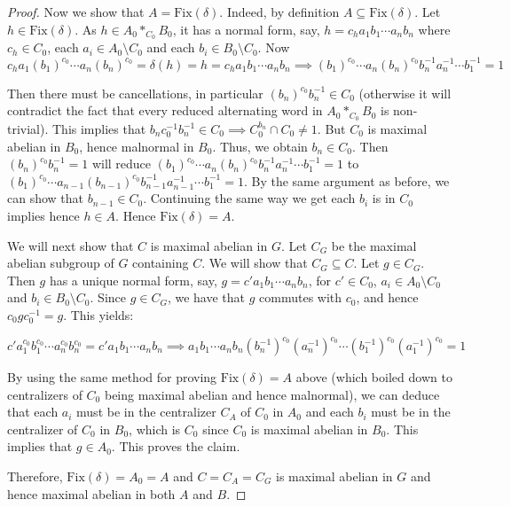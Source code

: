 \documentclass{amsart}
\newcommand{\vs}{\vspace{10pt}}
\theoremstyle{plain}
\theoremstyle{definition}
\theoremstyle{remark}
\begin{document}
\begin{proof}
\vs 

Now we show that $A = \text{Fix}(\delta)$. Indeed, by definition $A \subseteq \text{Fix}(\delta)$. Let $h \in \text{Fix}(\delta)$. As $h \in A_0 *_{C_0} B_0$, it has a normal form, say, $h = c_h a_1b_1 \cdots a_nb_n$ where $c_h \in C_0$, each $a_i \in A_0 \setminus C_0$ and each $b_i \in B_0 \setminus C_0$. Now 
    \[
    c_h a_1(b_1)^{c_0} \cdots a_n(b_n)^{c_0} = \delta (h) = h = c_h a_1b_1 \cdots a_nb_n
    \implies (b_1)^{c_0} \cdots a_n(b_n)^{c_0} b_n^{-1}a_n^{-1} \cdots b_1^{-1} = 1
    \]

Then there must be cancellations, in particular $(b_n)^{c_0} b_n^{-1} \in C_0$ (otherwise it will contradict the fact that every reduced alternating word in $A_0 *_{C_0} B_0$ is non-trivial). This implies that $b_n c_0^{-1} b_n^{-1} \in C_0 \implies C_0^{b_n} \cap C_0\neq 1$. But $C_0$ is maximal abelian in $B_0$, hence malnormal in $B_0$. Thus, we obtain $b_n \in C_0$. Then $(b_n)^{c_0} b_n^{-1} = 1$ will reduce $(b_1)^{c_0} \cdots a_n(b_n)^{c_0} b_n^{-1}a_n^{-1} \cdots b_1^{-1} = 1$ to $(b_1)^{c_0} \cdots a_{n-1}(b_{n-1})^{c_0} b_{n-1}^{-1}a_{n-1}^{-1} \cdots b_1^{-1} = 1$. By the same argument as before, we can show that $b_{n-1} \in C_0$. Continuing the same way we get each $b_i$ is in $C_0$ implies hence $h \in A$. Hence $\text{Fix} (\delta) = A$.

\vs

We will next show that $C$ is maximal abelian in $G$. Let $C_G$ be the maximal abelian subgroup of $G$ containing $C$. We will show that $C_G \subseteq C$. Let $g \in C_G$. Then $g$ has a unique normal form, say, $g = c' a_1b_1 \cdots a_n b_n$, for $c' \in C_0$, $a_i \in A_0 \setminus C_0$ and $b_i \in B_0 \setminus C_0$. Since $g \in C_G$, we have that $g$ commutes with $c_0$, and hence $c_0 g c_0^{-1} = g$. This yields: 


$$ c' a_1^{c_0}b_1^{c_0} \cdots a_n^{c_0} b_n^{c_0} = c' a_1b_1 \cdots a_n b_n \implies a_1b_1 \cdots a_n b_n (b_n^{-1})^{c_0}(a_n^{-1})^{c_0} \cdots (b_1^{-1})^{c_0} (a_1^{-1})^{c_0} = 1$$


By using the same method for proving $\text{Fix} (\delta) = A$ above (which boiled down to centralizers of $C_0$ being maximal abelian and hence malnormal), we can deduce that each $a_i$ must be in the centralizer $C_A$ of $C_0$ in $A_0$ and each $b_i$ must be in the centralizer of $C_0$ in $B_0$, which is $C_0$ since $C_0$ is maximal abelian in $B_0$. This implies that $g \in A_0$. This proves the claim. 



Therefore, $\text{Fix}(\delta) = A_0 = A$ and $C = C_A = C_G$ is maximal abelian in $G$ and hence maximal abelian in both $A$ and $B$.

\end{proof}
\end{document}
